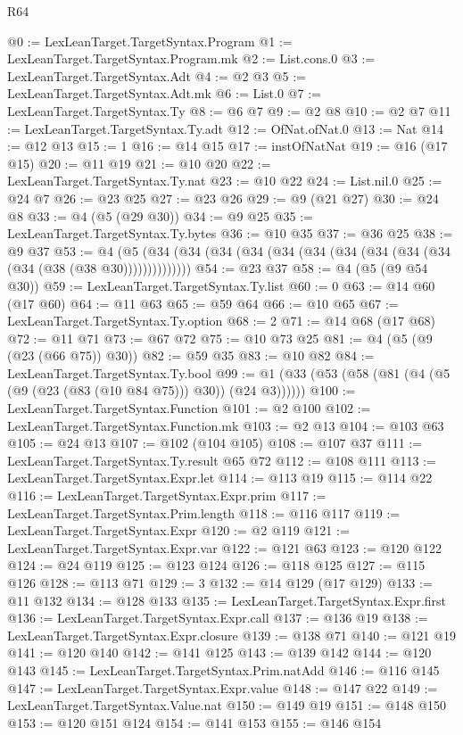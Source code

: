 \begin{lexlean}{R64}
\begin{coremodule}
@0 := LexLeanTarget.TargetSyntax.Program
@1 := LexLeanTarget.TargetSyntax.Program.mk
@2 := List.cons.{0}
@3 := LexLeanTarget.TargetSyntax.Adt
@4 := @2 @3
@5 := LexLeanTarget.TargetSyntax.Adt.mk
@6 := List.{0}
@7 := LexLeanTarget.TargetSyntax.Ty
@8 := @6 @7
@9 := @2 @8
@10 := @2 @7
@11 := LexLeanTarget.TargetSyntax.Ty.adt
@12 := OfNat.ofNat.{0}
@13 := Nat
@14 := @12 @13
@15 := 1
@16 := @14 @15
@17 := instOfNatNat
@19 := @16 (@17 @15)
@20 := @11 @19
@21 := @10 @20
@22 := LexLeanTarget.TargetSyntax.Ty.nat
@23 := @10 @22
@24 := List.nil.{0}
@25 := @24 @7
@26 := @23 @25
@27 := @23 @26
@29 := @9 (@21 @27)
@30 := @24 @8
@33 := @4 (@5 (@29 @30))
@34 := @9 @25
@35 := LexLeanTarget.TargetSyntax.Ty.bytes
@36 := @10 @35
@37 := @36 @25
@38 := @9 @37
@53 := @4 (@5 (@34 (@34 (@34 (@34 (@34 (@34 (@34 (@34 (@34 (@34 (@34 (@38 (@38 @30))))))))))))))
@54 := @23 @37
@58 := @4 (@5 (@9 @54 @30))
@59 := LexLeanTarget.TargetSyntax.Ty.list
@60 := 0
@63 := @14 @60 (@17 @60)
@64 := @11 @63
@65 := @59 @64
@66 := @10 @65
@67 := LexLeanTarget.TargetSyntax.Ty.option
@68 := 2
@71 := @14 @68 (@17 @68)
@72 := @11 @71
@73 := @67 @72
@75 := @10 @73 @25
@81 := @4 (@5 (@9 (@23 (@66 @75)) @30))
@82 := @59 @35
@83 := @10 @82
@84 := LexLeanTarget.TargetSyntax.Ty.bool
@99 := @1 (@33 (@53 (@58 (@81 (@4 (@5 (@9 (@23 (@83 (@10 @84 @75))) @30)) (@24 @3))))))
@100 := LexLeanTarget.TargetSyntax.Function
@101 := @2 @100
@102 := LexLeanTarget.TargetSyntax.Function.mk
@103 := @2 @13
@104 := @103 @63
@105 := @24 @13
@107 := @102 (@104 @105)
@108 := @107 @37
@111 := LexLeanTarget.TargetSyntax.Ty.result @65 @72
@112 := @108 @111
@113 := LexLeanTarget.TargetSyntax.Expr.let
@114 := @113 @19
@115 := @114 @22
@116 := LexLeanTarget.TargetSyntax.Expr.prim
@117 := LexLeanTarget.TargetSyntax.Prim.length
@118 := @116 @117
@119 := LexLeanTarget.TargetSyntax.Expr
@120 := @2 @119
@121 := LexLeanTarget.TargetSyntax.Expr.var
@122 := @121 @63
@123 := @120 @122
@124 := @24 @119
@125 := @123 @124
@126 := @118 @125
@127 := @115 @126
@128 := @113 @71
@129 := 3
@132 := @14 @129 (@17 @129)
@133 := @11 @132
@134 := @128 @133
@135 := LexLeanTarget.TargetSyntax.Expr.first
@136 := LexLeanTarget.TargetSyntax.Expr.call
@137 := @136 @19
@138 := LexLeanTarget.TargetSyntax.Expr.closure
@139 := @138 @71
@140 := @121 @19
@141 := @120 @140
@142 := @141 @125
@143 := @139 @142
@144 := @120 @143
@145 := LexLeanTarget.TargetSyntax.Prim.natAdd
@146 := @116 @145
@147 := LexLeanTarget.TargetSyntax.Expr.value
@148 := @147 @22
@149 := LexLeanTarget.TargetSyntax.Value.nat
@150 := @149 @19
@151 := @148 @150
@153 := @120 @151 @124
@154 := @141 @153
@155 := @146 @154

\end{coremodule}
\end{lexlean}
